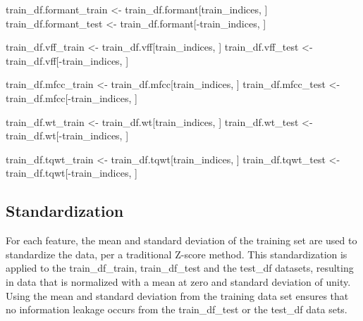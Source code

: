 \documentclass[
]{article}
\newenvironment{Shaded}{\begin{snugshade}}{\end{snugshade}}
\newcommand{\NormalTok}[1]{#1}
\newcommand{\OtherTok}[1]{\textcolor[rgb]{0.56,0.35,0.01}{#1}}
\newcommand{\SpecialCharTok}[1]{\textcolor[rgb]{0.00,0.00,0.00}{#1}}
\begin{document}
\begin{Shaded}
\begin{Highlighting}[]
\NormalTok{train\_df.formant\_train }\OtherTok{\textless{}{-}}\NormalTok{ train\_df.formant[train\_indices, ]}
\NormalTok{train\_df.formant\_test }\OtherTok{\textless{}{-}}\NormalTok{ train\_df.formant[}\SpecialCharTok{{-}}\NormalTok{train\_indices, ]}

\NormalTok{train\_df.vff\_train }\OtherTok{\textless{}{-}}\NormalTok{ train\_df.vff[train\_indices, ]}
\NormalTok{train\_df.vff\_test }\OtherTok{\textless{}{-}}\NormalTok{ train\_df.vff[}\SpecialCharTok{{-}}\NormalTok{train\_indices, ]}

\NormalTok{train\_df.mfcc\_train }\OtherTok{\textless{}{-}}\NormalTok{ train\_df.mfcc[train\_indices, ]}
\NormalTok{train\_df.mfcc\_test }\OtherTok{\textless{}{-}}\NormalTok{ train\_df.mfcc[}\SpecialCharTok{{-}}\NormalTok{train\_indices, ]}

\NormalTok{train\_df.wt\_train }\OtherTok{\textless{}{-}}\NormalTok{ train\_df.wt[train\_indices, ]}
\NormalTok{train\_df.wt\_test }\OtherTok{\textless{}{-}}\NormalTok{ train\_df.wt[}\SpecialCharTok{{-}}\NormalTok{train\_indices, ]}

\NormalTok{train\_df.tqwt\_train }\OtherTok{\textless{}{-}}\NormalTok{ train\_df.tqwt[train\_indices, ]}
\NormalTok{train\_df.tqwt\_test }\OtherTok{\textless{}{-}}\NormalTok{ train\_df.tqwt[}\SpecialCharTok{{-}}\NormalTok{train\_indices, ]}
\end{Highlighting}
\end{Shaded}

\newpage

\hypertarget{standardization}{%
\subsection{Standardization}\label{standardization}}

For each feature, the mean and standard deviation of the training set are used to standardize the data, per a traditional Z-score method. This standardization is applied to the train\_df\_train, train\_df\_test and the test\_df datasets, resulting in data that is normalized with a mean at zero and standard deviation of unity. Using the mean and standard deviation from the training data set ensures that no information leakage occurs from the train\_df\_test or the test\_df data sets.
\end{document}

